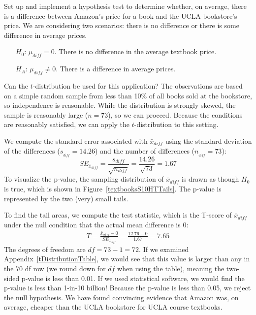 \begin{example}{Set up and implement a hypothesis test to determine whether, on average, there is a difference between Amazon's price for a book and the UCLA bookstore's price.}
\label{htForDiffInUCLAAndAmazonTextbookPrices}
We are considering two scenarios: there is no difference or there is some difference in average prices.
\begin{itemize}
\setlength{\itemsep}{0mm}
\item[$H_0$:] $\mu_{diff}=0$. There is no difference in the average textbook price.
\item[$H_A$:] $\mu_{diff} \neq 0$. There is a difference in average prices.
\end{itemize}

Can the $t$-distribution be used for this application? The observations are based on a simple random sample from less than 10\% of all books sold at the bookstore, so independence is reasonable. While the distribution is strongly skewed, the sample is reasonably large ($n=73$), so we can proceed. Because the conditions are reasonably satisfied, we can apply the $t$-distribution to this setting.

We compute the standard error associated with $\bar{x}_{diff}$ using the standard deviation of the differences ($s_{_{diff}}=14.26$) and the number of differences ($n_{_{diff}}=73$):
$$SE_{\bar{x}_{diff}} = \frac{s_{diff}}{\sqrt{n_{diff}}} = \frac{14.26}{\sqrt{73}} = 1.67$$
To visualize the p-value, the sampling distribution of $\bar{x}_{diff}$ is drawn as though $H_0$ is true, which is shown in Figure~\ref{textbooksS10HTTails}. The p-value is represented by the two (very) small tails.

To find the tail areas, we compute the test statistic, which is the T-score of $\bar{x}_{diff}$ under the null condition that the actual mean difference is 0:
\begin{align*}
T = \frac{\bar{x}_{diff} - 0}{SE_{x_{diff}}} = \frac{12.76 - 0}{1.67} = 7.65
\end{align*}
The degrees of freedom are $df = 73 - 1 = 72$. If we examined Appendix~\vref{tDistributionTable}, we would see that this value is larger than any in the 70 df row (we round down for $df$ when using the table), meaning the two-sided p-value is less than 0.01. If we used statistical software, we would find the p-value is less than 1-in-10 billion! Because the p-value is less than 0.05, we reject the null hypothesis. We have found convincing evidence that Amazon was, on average, cheaper than the UCLA bookstore for UCLA course textbooks.
\end{example}

